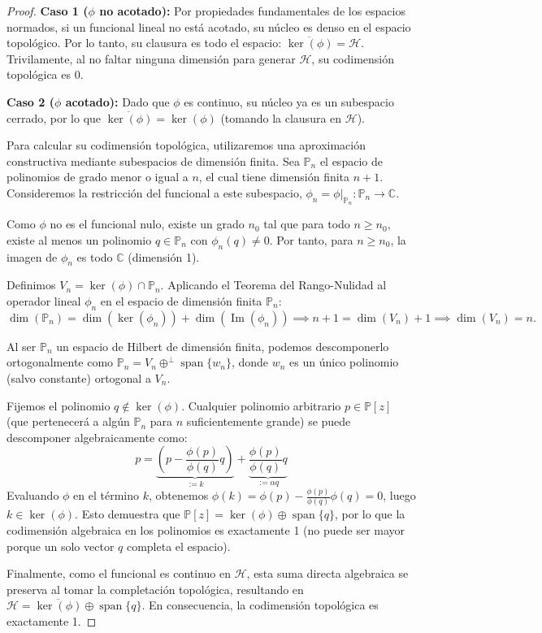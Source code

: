 \documentclass[12pt,a4paper]{article}
\theoremstyle{definition}
\theoremstyle{remark}
\begin{document}
\begin{proof}
	\textbf{Caso 1 ($\phi$ no acotado):} Por propiedades fundamentales de los espacios normados, si un funcional lineal no está acotado, su núcleo es denso en el espacio topológico. Por lo tanto, su clausura es todo el espacio: $\overline{\ker(\phi)} = \mathcal{H}$. Trivilamente, al no faltar ninguna dimensión para generar $\mathcal{H}$, su codimensión topológica es 0.

	\textbf{Caso 2 ($\phi$ acotado):} Dado que $\phi$ es continuo, su núcleo ya es un subespacio cerrado, por lo que $\overline{\ker(\phi)} = \ker(\phi)$ (tomando la clausura en $\mathcal{H}$).

	Para calcular su codimensión topológica, utilizaremos una aproximación constructiva mediante subespacios de dimensión finita. Sea $\mathbb{P}_n$ el espacio de polinomios de grado menor o igual a $n$, el cual tiene dimensión finita $n+1$.
	Consideremos la restricción del funcional a este subespacio, $\phi_n = \phi|_{\mathbb{P}_n} : \mathbb{P}_n \to \mathbb{C}$.

	Como $\phi$ no es el funcional nulo, existe un grado $n_0$ tal que para todo $n \ge n_0$, existe al menos un polinomio $q \in \mathbb{P}_n$ con $\phi_n(q) \neq 0$. Por tanto, para $n \ge n_0$, la imagen de $\phi_n$ es todo $\mathbb{C}$ (dimensión 1).

	Definimos $V_n = \ker(\phi) \cap \mathbb{P}_n$. Aplicando el Teorema del Rango-Nulidad al operador lineal $\phi_n$ en el espacio de dimensión finita $\mathbb{P}_n$:
	$$ \dim(\mathbb{P}_n) = \dim(\ker(\phi_n)) + \dim(\operatorname{Im}(\phi_n)) \implies n+1 = \dim(V_n) + 1 \implies \dim(V_n) = n. $$

	Al ser $\mathbb{P}_n$ un espacio de Hilbert de dimensión finita, podemos descomponerlo ortogonalmente como $\mathbb{P}_n = V_n \oplus^\perp \operatorname{span}\{w_n\}$, donde $w_n$ es un único polinomio (salvo constante) ortogonal a $V_n$.

	Fijemos el polinomio $q \notin \ker(\phi)$. Cualquier polinomio arbitrario $p \in \mathbb{P}[z]$ (que pertenecerá a algún $\mathbb{P}_n$ para $n$ suficientemente grande) se puede descomponer algebraicamente como:
	$$ p = \underbrace{\left( p - \frac{\phi(p)}{\phi(q)} q \right)}_{:= k} + \underbrace{\frac{\phi(p)}{\phi(q)} q}_{:= \alpha q} $$
	Evaluando $\phi$ en el término $k$, obtenemos $\phi(k) = \phi(p) - \frac{\phi(p)}{\phi(q)}\phi(q) = 0$, luego $k \in \ker(\phi)$.
	Esto demuestra que $\mathbb{P}[z] = \ker(\phi) \oplus \operatorname{span}\{q\}$, por lo que la codimensión algebraica en los polinomios es exactamente 1 (no puede ser mayor porque un solo vector $q$ completa el espacio).

	Finalmente, como el funcional es continuo en $\mathcal{H}$, esta suma directa algebraica se preserva al tomar la completación topológica, resultando en $\mathcal{H} = \overline{\ker(\phi)} \oplus \operatorname{span}\{q\}$. En consecuencia, la codimensión topológica es exactamente 1.
\end{proof}
\end{document}
